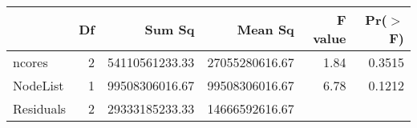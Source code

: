\begin{table}[ht]
\centering
\begin{tabular}{lrrrrr}
  \hline
 & Df & Sum Sq & Mean Sq & F value & Pr($>$F) \\ 
  \hline
ncores & 2 & 54110561233.33 & 27055280616.67 & 1.84 & 0.3515 \\ 
  NodeList & 1 & 99508306016.67 & 99508306016.67 & 6.78 & 0.1212 \\ 
  Residuals & 2 & 29333185233.33 & 14666592616.67 &  &  \\ 
   \hline
\end{tabular}
\end{table}
